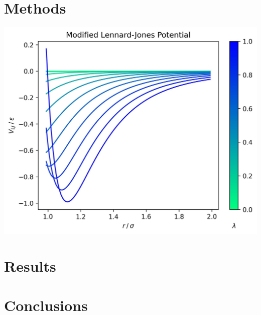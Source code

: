 \documentclass[]{article}
\begin{document}
\section*{Methods}

\includegraphics[width=0.5\linewidth]{modLJ.jpg}

\section*{Results}

\section*{Conclusions}
\end{document}

